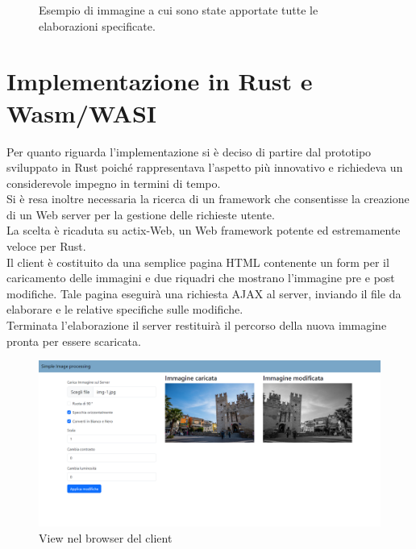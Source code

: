 \begin{figure}
\begin{minipage}{.5\textwidth}
    \end{minipage}
    \caption[Esempio immagine pre/post elaborazione]{Esempio di immagine a cui sono state apportate tutte le elaborazioni specificate.}
\end{figure}
\newpage
\section{Implementazione in Rust e Wasm/WASI}
Per quanto riguarda l'implementazione si è deciso di partire dal prototipo sviluppato in Rust poiché rappresentava l'aspetto più innovativo e richiedeva un considerevole impegno in termini di tempo.
\\Si è resa inoltre necessaria la ricerca di un framework che consentisse la creazione di un Web server per la gestione delle richieste utente.
\\La scelta è ricaduta su actix-Web, un Web framework potente ed estremamente veloce per Rust.
\\Il client è costituito da una semplice pagina HTML contenente un form per il caricamento delle immagini e due riquadri che mostrano l'immagine pre e post modifiche.
Tale pagina eseguirà una richiesta AJAX al server, inviando il file da elaborare e le relative specifiche sulle modifiche.
\\Terminata l'elaborazione il server restituirà il percorso della nuova immagine pronta per essere scaricata.
\newpage
\begin{figure}
    \begin{center}
            \includegraphics[width=1\columnwidth]{images/client.png}
    \end{center}
    \caption{View nel browser del client}
    \label{fig:client}
\end{figure}
